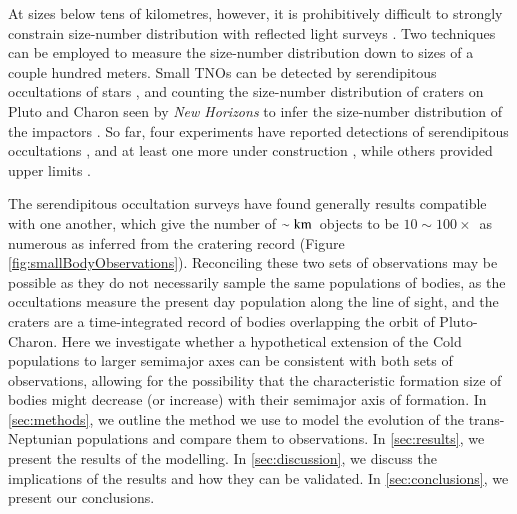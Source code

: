 \documentclass[printer]{aa}
\newcommand{\revised}{\color{black}}
\begin{document}
At sizes below tens of kilometres, however, it is prohibitively difficult to strongly constrain size-number distribution with reflected light surveys \citep{2004AJ....128.1364B, 2014ApJ...782..100F}.  Two techniques can be employed to measure the size-number distribution down to sizes of a couple hundred meters.  Small TNOs can be detected by serendipitous occultations of stars \citep{2003ApJ...594L..63R, 2009Natur.462..895S}, and counting the size-number distribution of craters on Pluto and Charon seen by \textit{New Horizons} to infer the size-number distribution of the impactors \citep{2017Icar..287..187R}.  So far, four experiments have reported detections of serendipitous occultations \citep[][]{2012ApJ...761..150S, 2015MNRAS.446..932L, 2019NatAs...3..301A, 2020submitted}, and at least one more under construction \citep{2019EPSC...13.1089L}, while others provided upper limits \citep{2008AJ....135.1039B,2009AJ....138..568B,2010AJ....139.2003W,2013MNRAS.429.1626C,2013AJ....146...14Z}.

The serendipitous occultation surveys have found generally results compatible with one another, which give the number of $\sim\rm{km}$~objects to be $10 \sim 100 \times$~as numerous as inferred from the cratering record \citep{2019Sci...363..955S} (Figure \ref{fig:smallBodyObservations}).  Reconciling these two sets of observations may be possible as they do not necessarily sample the same populations of bodies{\revised, as the occultations measure the present day population along the line of sight, and the craters are a time-integrated record of bodies overlapping the orbit of Pluto-Charon}.  Here we investigate whether a hypothetical extension of the Cold populations to larger semimajor axes can be consistent with both sets of observations, allowing for the possibility that the characteristic formation size of bodies might decrease (or increase) with their semimajor axis of formation.  In \textsection \ref{sec:methods}, we outline the method we use to model the evolution of the trans-Neptunian populations and compare them to observations.  In \textsection \ref{sec:results}, we present the results of the modelling.  In \textsection \ref{sec:discussion}, we discuss the implications of the results and how they can be validated.  In \textsection \ref{sec:conclusions}, we present our conclusions.
\end{document}
